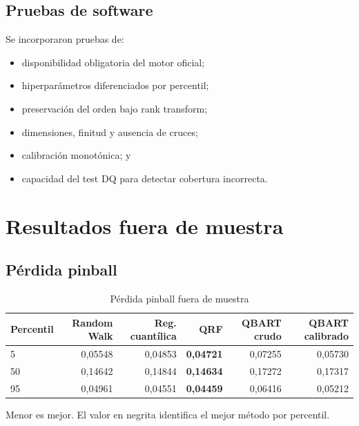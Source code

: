 \documentclass[11pt,a4paper]{article}
\begin{document}
\subsection{Pruebas de software}

Se incorporaron pruebas de:

\begin{itemize}[leftmargin=*]
  \item disponibilidad obligatoria del motor oficial;
  \item hiperparámetros diferenciados por percentil;
  \item preservación del orden bajo rank transform;
  \item dimensiones, finitud y ausencia de cruces;
  \item calibración monotónica; y
  \item capacidad del test DQ para detectar cobertura incorrecta.
\end{itemize}

\section{Resultados fuera de muestra}

\subsection{Pérdida pinball}

\begin{table}[H]
\centering
\caption{Pérdida pinball fuera de muestra}
\label{tab:score}
\begin{threeparttable}
\begin{tabular}{lrrrrr}
\toprule
Percentil & Random Walk & Reg. cuantílica & QRF & QBART crudo & QBART calibrado \\
\midrule
5  & 0,05548 & 0,04853 & \textbf{0,04721} & 0,07255 & 0,05730 \\
50 & 0,14642 & 0,14844 & \textbf{0,14634} & 0,17272 & 0,17317 \\
95 & 0,04961 & 0,04551 & \textbf{0,04459} & 0,06416 & 0,05212 \\
\bottomrule
\end{tabular}
\begin{tablenotes}[flushleft]\footnotesize
\item Menor es mejor. El valor en negrita identifica el mejor método por
percentil.
\end{tablenotes}
\end{threeparttable}
\end{table}
\end{document}
